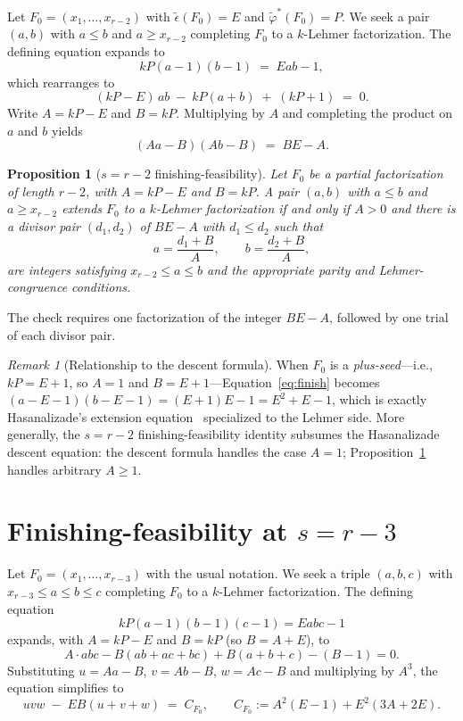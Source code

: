 \documentclass[11pt]{article}
\newtheorem{proposition}[theorem]{Proposition}
\theoremstyle{definition}
\theoremstyle{remark}
\newtheorem{remark}[theorem]{Remark}
\newcommand{\eps}{\tilde{\epsilon}}
\newcommand{\phist}{\tilde{\varphi}^*}
\begin{document}
Let $F_0 = (x_1, \ldots, x_{r-2})$ with $\eps(F_0) = E$ and
$\phist(F_0) = P$.  We seek a pair $(a, b)$ with $a \le b$ and
$a \ge x_{r-2}$ completing $F_0$ to a $k$-Lehmer factorization.  The
defining equation expands to
\[
  kP(a - 1)(b - 1) \;=\; Eab - 1,
\]
which rearranges to
\[
  (kP - E)\,ab \;-\; kP(a + b) \;+\; (kP + 1) \;=\; 0.
\]
Write $A = kP - E$ and $B = kP$.  Multiplying by $A$ and completing the
product on $a$ and $b$ yields
\begin{equation}\label{eq:finish}
  (A a - B)(A b - B) \;=\; B E - A.
\end{equation}

\begin{proposition}[$s = r - 2$ finishing-feasibility]\label{prop:rm2}
Let $F_0$ be a partial factorization of length $r - 2$, with $A = kP - E$
and $B = kP$.  A pair $(a, b)$ with $a \le b$ and $a \ge x_{r-2}$ extends
$F_0$ to a $k$-Lehmer factorization if and only if $A > 0$ and there is
a divisor pair $(d_1, d_2)$ of $BE - A$ with $d_1 \le d_2$ such that
\[
  a = \frac{d_1 + B}{A},
  \qquad
  b = \frac{d_2 + B}{A},
\]
are integers satisfying $x_{r-2} \le a \le b$ and the appropriate
parity and Lehmer-congruence conditions.
\end{proposition}

The check requires one factorization of the integer $BE - A$, followed
by one trial of each divisor pair.

\begin{remark}[Relationship to the descent formula]
When $F_0$ is a \emph{plus-seed}---i.e., $k P = E + 1$, so $A = 1$ and
$B = E + 1$---Equation~\eqref{eq:finish} becomes
$(a - E - 1)(b - E - 1) = (E + 1) E - 1 = E^2 + E - 1$, which is exactly
Hasanalizade's extension equation~\cite{H26} specialized to the Lehmer
side.  More generally, the $s = r - 2$ finishing-feasibility identity
subsumes the Hasanalizade descent equation: the descent formula handles
the case $A = 1$; Proposition~\ref{prop:rm2} handles arbitrary $A \ge 1$.
\end{remark}


\section{Finishing-feasibility at $s = r - 3$}

Let $F_0 = (x_1, \ldots, x_{r-3})$ with the usual notation. We seek a
triple $(a, b, c)$ with $x_{r-3} \le a \le b \le c$ completing $F_0$
to a $k$-Lehmer factorization. The defining equation
\[
  kP(a-1)(b-1)(c-1) = Eabc - 1
\]
expands, with $A = kP - E$ and $B = kP$ (so $B = A + E$), to
\begin{equation}\label{eq:3var}
  A \cdot abc - B(ab+ac+bc) + B(a+b+c) - (B - 1) = 0.
\end{equation}
Substituting $u = Aa - B$, $v = Ab - B$, $w = Ac - B$ and multiplying
by $A^3$, the equation simplifies to
\begin{equation}\label{eq:3var-uvw}
  uvw \;-\; EB(u + v + w) \;=\; C_{F_0},
  \qquad
  C_{F_0} := A^2(E - 1) + E^2(3A + 2E).
\end{equation}
\end{document}
